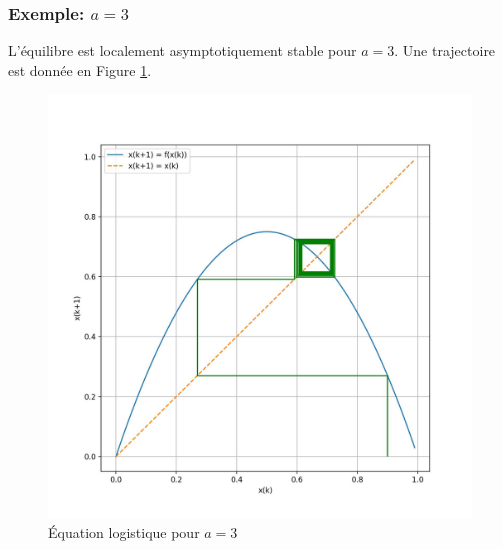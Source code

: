             \subsubsection{Exemple: $a = 3$}
                L’équilibre est localement asymptotiquement stable pour $a = 3$.
                Une trajectoire est donnée en Figure \ref{fig:logistique_differences_5}.
                \begin{figure}[ht!]
                    \centering
                    \includegraphics[width=\textwidth]{images/logistique_differences_5.jpg}
                    \caption{Équation logistique pour $a=3$}
                    \label{fig:logistique_differences_5}
                \end{figure}
            
